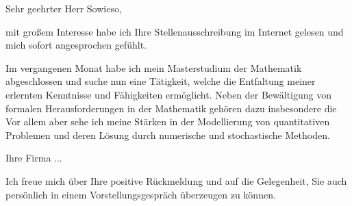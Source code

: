 \documentclass[11pt,a4paper,sans]{moderncv}        %
\begin{document}
{Sehr geehrter Herr Sowieso,}

\begin{justify}
mit großem Interesse habe ich Ihre Stellenausschreibung im Internet gelesen und mich sofort angesprochen gefühlt. 

Im vergangenen Monat habe ich mein Masterstudium der Mathematik abgeschlossen und suche nun eine Tätigkeit, welche die Entfaltung meiner erlernten Kenntnisse und Fähigkeiten ermöglicht.
Neben der Bewältigung von formalen Herausforderungen in der Mathematik gehören dazu insbesondere die 
Vor allem aber sehe ich meine Stärken in der Modellierung von quantitativen Problemen und deren Lösung durch numerische und stochastische Methoden. 
 
Ihre Firma  ...

Ich freue mich über Ihre positive Rückmeldung und auf die Gelegenheit, Sie auch persönlich in einem Vorstellungsgespräch überzeugen zu können.
\end{justify}

\makeletterclosing

\end{document}

